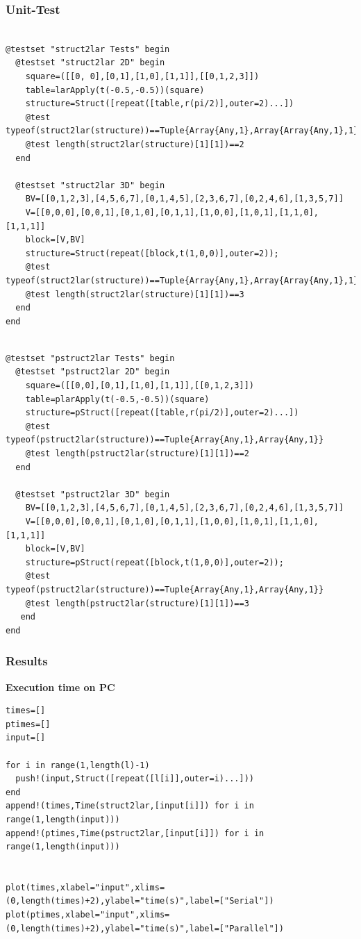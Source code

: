 \documentclass[a4paper,12pt]{article}
\begin{document}
\subsubsection{Unit-Test}
\begin{Verbatim}[fontsize=\footnotesize]

@testset "struct2lar Tests" begin
  @testset "struct2lar 2D" begin
    square=([[0, 0],[0,1],[1,0],[1,1]],[[0,1,2,3]])
    table=larApply(t(-0.5,-0.5))(square)
    structure=Struct([repeat([table,r(pi/2)],outer=2)...])
    @test typeof(struct2lar(structure))==Tuple{Array{Any,1},Array{Array{Any,1},1}}
    @test length(struct2lar(structure)[1][1])==2
  end
  
  @testset "struct2lar 3D" begin
    BV=[[0,1,2,3],[4,5,6,7],[0,1,4,5],[2,3,6,7],[0,2,4,6],[1,3,5,7]]
    V=[[0,0,0],[0,0,1],[0,1,0],[0,1,1],[1,0,0],[1,0,1],[1,1,0],[1,1,1]]
    block=[V,BV]
    structure=Struct(repeat([block,t(1,0,0)],outer=2));
    @test typeof(struct2lar(structure))==Tuple{Array{Any,1},Array{Array{Any,1},1}}
    @test length(struct2lar(structure)[1][1])==3
  end
end

\end{Verbatim}

\noindent{}
\begin{Verbatim}[fontsize=\footnotesize]

@testset "pstruct2lar Tests" begin
  @testset "pstruct2lar 2D" begin
    square=([[0,0],[0,1],[1,0],[1,1]],[[0,1,2,3]])
    table=plarApply(t(-0.5,-0.5))(square)
    structure=pStruct([repeat([table,r(pi/2)],outer=2)...])
    @test typeof(pstruct2lar(structure))==Tuple{Array{Any,1},Array{Any,1}}
    @test length(pstruct2lar(structure)[1][1])==2
  end
  
  @testset "pstruct2lar 3D" begin
    BV=[[0,1,2,3],[4,5,6,7],[0,1,4,5],[2,3,6,7],[0,2,4,6],[1,3,5,7]]
    V=[[0,0,0],[0,0,1],[0,1,0],[0,1,1],[1,0,0],[1,0,1],[1,1,0],[1,1,1]]
    block=[V,BV]
    structure=pStruct(repeat([block,t(1,0,0)],outer=2));
    @test typeof(pstruct2lar(structure))==Tuple{Array{Any,1},Array{Any,1}}
    @test length(pstruct2lar(structure)[1][1])==3
   end
end

\end{Verbatim}

\subsubsection{Results}
\textbf{Execution time on PC}
\begin{Verbatim}[fontsize=\footnotesize]
times=[]
ptimes=[]
input=[]

for i in range(1,length(l)-1)
  push!(input,Struct([repeat([l[i]],outer=i)...]))
end
append!(times,Time(struct2lar,[input[i]]) for i in range(1,length(input)))
append!(ptimes,Time(pstruct2lar,[input[i]]) for i in range(1,length(input)))


plot(times,xlabel="input",xlims=(0,length(times)+2),ylabel="time(s)",label=["Serial"])
plot(ptimes,xlabel="input",xlims=(0,length(times)+2),ylabel="time(s)",label=["Parallel"])

\end{Verbatim}
\end{document}
